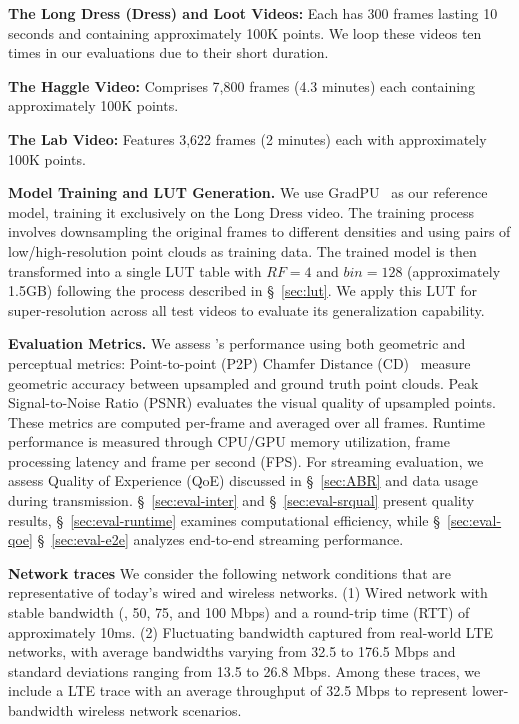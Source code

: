 \BULLET \textbf{The Long Dress (Dress) and Loot Videos:} Each has 300 frames lasting 10 seconds and containing approximately 100K points. We loop these videos ten times in our evaluations due to their short duration.

\BULLET \textbf{The Haggle Video:} Comprises 7,800 frames (4.3 minutes) each containing approximately 100K points.

\BULLET\textbf{The Lab Video:} Features 3,622 frames (2 minutes) each with approximately 100K points.


\textbf{Model Training and LUT Generation.} We use GradPU~\cite{he_grad-pu_2023} as our reference model, training it exclusively on the Long Dress video. The training process involves downsampling the original frames to different densities and using pairs of low/high-resolution point clouds as training data. The trained model is then transformed into a single LUT table with $RF=4$ and $bin=128$ (approximately 1.5GB) following the process described in \S~\ref{sec:lut}. We apply this LUT for super-resolution across all test videos to evaluate its generalization capability.

\textbf{Evaluation Metrics.} We assess \name's performance using both geometric and perceptual metrics:
Point-to-point (P2P) Chamfer Distance (CD)~\cite{wuDensityawareChamferDistance2021,li_pu-gan_2019} measure geometric accuracy between upsampled and ground truth point clouds. Peak Signal-to-Noise Ratio (PSNR) evaluates the visual quality of upsampled points. These metrics are computed per-frame and averaged over all frames. Runtime performance is measured through CPU/GPU memory utilization, frame processing latency and frame per second (FPS). For streaming evaluation, we assess Quality of Experience (QoE) discussed in \S~\ref{sec:ABR} and data usage during transmission. \S~\ref{sec:eval-inter} and \S~\ref{sec:eval-srqual} present quality results, \S~\ref{sec:eval-runtime} examines computational efficiency, while \S~\ref{sec:eval-qoe} \S~\ref{sec:eval-e2e} analyzes end-to-end streaming performance.

\textbf{Network traces} We consider the following network conditions that are representative of today's wired and wireless networks. (1) Wired network with stable bandwidth (\eg, 50, 75, and 100 Mbps) and a round-trip time (RTT) of approximately 10ms. (2) Fluctuating bandwidth captured from real-world LTE networks, with average bandwidths varying from 32.5 to 176.5 Mbps and standard deviations ranging from 13.5 to 26.8 Mbps. Among these traces, we include a LTE trace with an average throughput of 32.5 Mbps to represent lower-bandwidth wireless network scenarios. 

